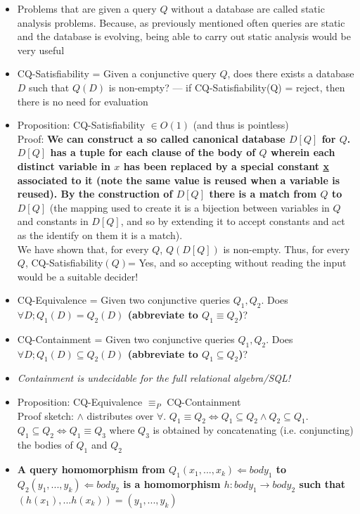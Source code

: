 \documentclass[20pt,a4paper,landscape]{extarticle}
\begin{document}
\begin{flushleft}
\begin{itemize}
\item Problems that are given a query $Q$ without a database are called static analysis problems. Because, as previously mentioned often queries are static and the database is evolving, being able to carry out static analysis would be very useful
\item CQ-Satisfiability = Given a conjunctive query $Q$, does there exists a database $D$ such that $Q(D)$ is non-empty? --- if CQ-Satisfiability(Q) = reject, then there is no need for evaluation
\item Proposition: CQ-Satisfiability $\in O(1)$ (and thus is pointless)\\
Proof: \textbf{We can construct a so called canonical database \boldmath$D[Q]$ for $Q$. $D[Q]$ has a tuple for each clause of the body of $Q$ wherein each distinct variable in $x$ has been replaced by a special constant \underline{x} associated to it (note the same value is reused when a variable is reused). By the construction of $D[Q]$ there is a match from $Q$ to $D[Q]$} (the mapping used to create it is a bijection between variables in $Q$ and constants in $D[Q]$, and so by extending it to accept constants and act as the identify on them it is a match).\\
We have shown that, for every $Q$, $Q(D[Q])$ is non-empty. Thus, for every $Q$, CQ-Satisfiability$(Q)$= Yes, and so accepting without reading the input would be a suitable decider!
\item CQ-Equivalence = Given two conjunctive queries $Q_1, Q_2$. Does \textbf{\boldmath$\forall D; Q_1(D) = Q_2(D)$ (abbreviate to $Q_1 \equiv Q_2$)}?
\item CQ-Containment = Given two conjunctive queries $Q_1, Q_2$. Does \textbf{\boldmath$\forall D; Q_1(D) \subseteq Q_2(D)$ (abbreviate to $Q_1 \subseteq Q_2$)}?
\item \textit{Containment is undecidable for the full relational algebra/SQL!}
\item Proposition: CQ-Equivalence $\equiv_P$ CQ-Containment\\
Proof sketch: $\land$ distributes over $\forall$. $Q_1 \equiv Q_2 \Leftrightarrow Q_1 \subseteq Q_2 \land Q_2 \subseteq Q_1$. $Q_1 \subseteq Q_2 \Leftrightarrow Q_1 \equiv Q_3$ where $Q_3$ is obtained by concatenating (i.e. conjuncting) the bodies of $Q_1$ and $Q_2$
\item \textbf{A query homomorphism from \boldmath$Q_1(x_1, ..., x_k) \Leftarrow body_1$ to \boldmath$Q_2(y_1, ..., y_k) \Leftarrow body_2$ is a homomorphism $h: body_1 \to body_2$ such that $(h(x_1), ... h(x_k)) = (y_1, ..., y_k)$}

\end{itemize}
\end{flushleft}
\end{document}
